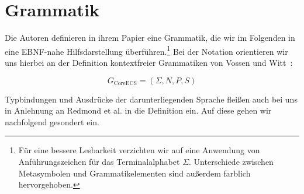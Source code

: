 \section{Grammatik}

Die Autoren definieren in ihrem Papier eine Grammatik, die wir im Folgenden in eine EBNF-nahe Hilfsdarstellung überführen.\footnote{
    Für eine bessere Lesbarkeit verzichten wir auf eine Anwendung von Anführungszeichen für das Terminalalphabet $\Sigma$.
    Unterschiede zwischen Metasymbolen und Grammatikelementen sind außerdem farblich hervorgehoben.
}
Bei der Notation orientieren wir uns hierbei an der Definition kontextfreier Grammatiken von Vossen und Witt~\cite{VW16}:

\[
 G_{\text{CoreECS}} = (\Sigma, N, P, S)
\]

\noindent
Typbindungen und Ausdrücke der darunterliegenden Sprache fleißen auch bei uns in Anlehnung an Redmond et al. in die Definition ein.
Auf diese gehen wir nachfolgend gesondert ein.


